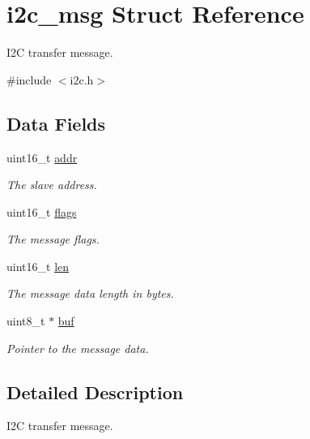 \hypertarget{structi2c__msg}{}\section{i2c\+\_\+msg Struct Reference}
\label{structi2c__msg}


I2C transfer message.  




{\ttfamily \#include $<$i2c.\+h$>$}

\subsection*{Data Fields}
\begin{DoxyCompactItemize}
\item 
uint16\+\_\+t \mbox{\hyperlink{structi2c__msg_aeef06bd01ffe9f348987c253d11ba721}{addr}}
\begin{DoxyCompactList}\small\item\em The slave address. \end{DoxyCompactList}\item 
uint16\+\_\+t \mbox{\hyperlink{structi2c__msg_a8633f67b7fb7d6e4b4389d8a5b999e5f}{flags}}
\begin{DoxyCompactList}\small\item\em The message flags. \end{DoxyCompactList}\item 
\mbox{\label{structi2c__msg_a37325b060739b4bdeac3af344af2117f}} 
uint16\+\_\+t \mbox{\hyperlink{structi2c__msg_a37325b060739b4bdeac3af344af2117f}{len}}
\begin{DoxyCompactList}\small\item\em The message data length in bytes. \end{DoxyCompactList}\item 
\mbox{\label{structi2c__msg_ac4aa590487270589a51964b38f853a37}} 
uint8\+\_\+t $\ast$ \mbox{\hyperlink{structi2c__msg_ac4aa590487270589a51964b38f853a37}{buf}}
\begin{DoxyCompactList}\small\item\em Pointer to the message data. \end{DoxyCompactList}\end{DoxyCompactItemize}


\subsection{Detailed Description}
I2C transfer message. 

